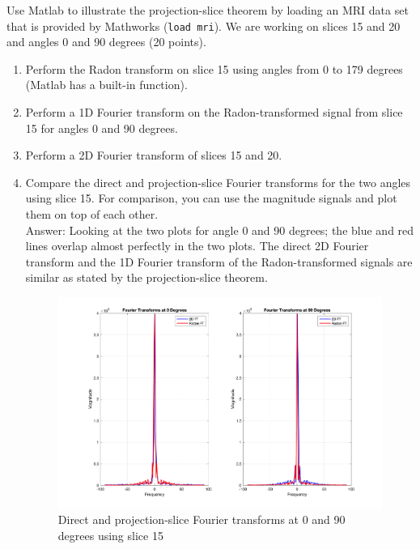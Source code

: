 \documentclass[12pt,twoside]{article}
\begin{document}
\noindent
Use Matlab to illustrate the projection-slice theorem by loading an MRI data set that is provided by Mathworks (\texttt{load mri}). 
We are working on slices 15 and 20 and angles 0 and 90 degrees (20 points).

\begin{enumerate}
    \item Perform the Radon transform on slice 15 using angles from 0 to 179 degrees (Matlab has a built-in function).
    \item Perform a 1D Fourier transform on the Radon-transformed signal from slice 15 for angles 0 and 90 degrees.
    \item Perform a 2D Fourier transform of slices 15 and 20.
    \item Compare the direct and projection-slice Fourier transforms for the two angles using slice 15. 
    For comparison, you can use the magnitude signals and plot them on top of each other.\\
    Answer: Looking at the two plots for angle 0 and 90 degrees; 
    the blue and red lines overlap almost perfectly in the two plots. The direct 2D Fourier transform and the 1D Fourier transform of the Radon-transformed signals
    are similar as stated by the projection-slice theorem.
     \begin{figure}[H]
    \centering
    \captionsetup{justification=raggedright,singlelinecheck=false}
    \includegraphics[width=400pt]{fig1.png}
    \caption{Direct and projection-slice Fourier transforms  at 0 and 90 degrees using slice 15}
    \label{fig1}
     \end{figure}
    	

\end{enumerate}
\end{document}
